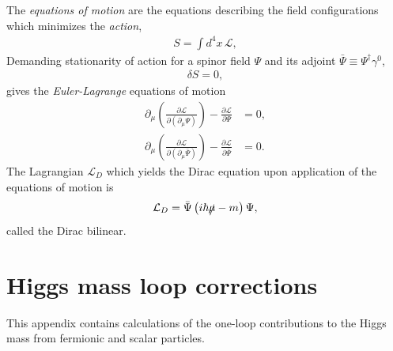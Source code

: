 \documentclass[twoside,english]{uiofysmaster}
\begin{document}
The {\it equations of motion} are the equations describing the field configurations which minimizes the {\it action},
\begin{align}
	S = \int d^4 x \, \mathcal{L},
\end{align}
Demanding stationarity of action for a spinor field $\Psi$ and its adjoint $\bar\Psi \equiv  \Psi^\dag \gamma^0$,
\begin{align}
	\delta S = 0,
\end{align}
gives the {\it Euler-Lagrange} equations of motion
\begin{align}
	\partial_{\mu}\left(\frac{\partial\mathcal{L}}{\partial\left(\partial_{\mu}\Psi\right)}\right) - \frac{\partial\mathcal{L}}{\partial\Psi} &= 0,\\
	\partial_{\mu}\left(\frac{\partial\mathcal{L}}{\partial\left(\partial_{\mu}\bar\Psi\right)}\right) - \frac{\partial\mathcal{L}}{\partial\bar\Psi} &= 0.
\end{align}
The Lagrangian $\mathcal{L}_D$ which yields the Dirac equation upon application of the equations of motion is
\begin{align}
	\mathcal{L}_D = \bar \Psi \left( i\hbar \slashed \mu - m \right)\Psi,
\end{align}
called the Dirac bilinear.




\chapter{Higgs mass loop corrections}
\label{appendix:higgs_mass_loop_correction}
This appendix contains calculations of the one-loop contributions to the Higgs mass from fermionic and scalar particles.
\end{document}
